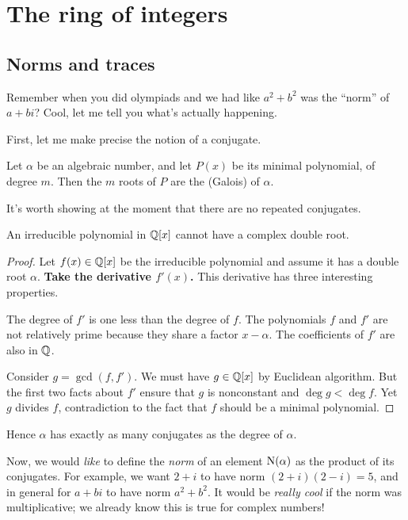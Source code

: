 \chapter{The ring of integers}
\label{ch:ring_of_integers}
\section{Norms and traces}
\label{sec:norms_traces}
Remember when you did olympiads and we had like $a^2+b^2$ was the ``norm'' of $a+bi$?
Cool, let me tell you what's actually happening.

First, let me make precise the notion of a conjugate.
\begin{definition}
	Let $\alpha$ be an algebraic number, and let $P(x)$ be its minimal polynomial,
	of degree $m$.
	Then the $m$ roots of $P$ are the (Galois)  of $\alpha$.
\end{definition}
It's worth showing at the moment that there are no repeated conjugates.
\begin{lemma}
	An irreducible polynomial in $\mathbb Q[x]$ cannot have a complex double root.
	\label{lem:irred_complex}
\end{lemma}
\begin{proof}
	Let $f(x) \in \mathbb Q[x]$ be the irreducible polynomial and assume it has a double root $\alpha$.
	\textbf{Take the derivative $f'(x)$.}
	This derivative has three interesting properties.
	\begin{itemize}
		\ii The degree of $f'$ is one less than the degree of $f$.
		\ii The polynomials $f$ and $f'$ are not relatively prime
		because they share a factor $x-\alpha$.
		\ii The coefficients of $f'$ are also in $\mathbb Q$.
	\end{itemize}
	Consider $g = \gcd(f, f')$. We must have $g \in \mathbb Q[x]$ by Euclidean algorithm.
	But the first two facts about $f'$ ensure that $g$ is nonconstant
	and $\deg g < \deg f$.
	Yet $g$ divides $f$,
	contradiction to the fact that $f$ should be a minimal polynomial.
\end{proof}
Hence $\alpha$ has exactly as many conjugates as the degree of $\alpha$.

Now, we would \emph{like} to define the \emph{norm} of an element $\operatorname{N}(\alpha)$
as the product of its conjugates.
For example, we want $2+i$ to have norm $(2+i)(2-i) = 5$,
and in general for $a+bi$ to have norm $a^2+b^2$.
It would be \emph{really cool} if the norm was multiplicative;
we already know this is true for complex numbers!

